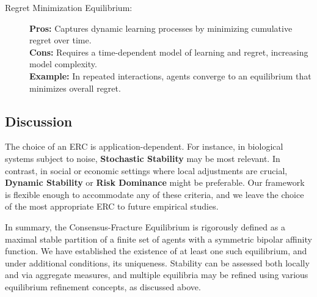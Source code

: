 \documentclass{article}
\begin{document}
\begin{description}
  \item[Regret Minimization Equilibrium:] 
    \textbf{Pros:} Captures dynamic learning processes by minimizing cumulative regret over time.\\
    \textbf{Cons:} Requires a time-dependent model of learning and regret, increasing model complexity.\\
    \textbf{Example:} In repeated interactions, agents converge to an equilibrium that minimizes overall regret.
\end{description}

\subsection{Discussion}
The choice of an ERC is application-dependent. For instance, in biological systems subject to noise, \textbf{Stochastic Stability} may be most relevant. In contrast, in social or economic settings where local adjustments are crucial, \textbf{Dynamic Stability} or \textbf{Risk Dominance} might be preferable. Our framework is flexible enough to accommodate any of these criteria, and we leave the choice of the most appropriate ERC to future empirical studies.

\bigskip

In summary, the Consensus-Fracture Equilibrium is rigorously defined as a maximal stable partition of a finite set of agents with a symmetric bipolar affinity function. We have established the existence of at least one such equilibrium, and under additional conditions, its uniqueness. Stability can be assessed both locally and via aggregate measures, and multiple equilibria may be refined using various equilibrium refinement concepts, as discussed above.
\end{document}
